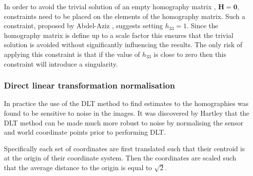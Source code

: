 \documentclass[12pt,oneside,openany,a4paper, %
english, %
masters-t, goldenblock]{usthesis}
\begin{document}
In order to avoid the trivial solution of an empty homography matrix , $\bm{H}=\bm{0}$, constraints need to be placed on the elements of the homography matrix. Such a constraint, proposed by Abdel-Aziz \cite{abdel1971direct}, suggests setting $h_{33}=1$. Since the homography matrix is define up to a scale factor this ensures that the trivial solution is avoided without significantly influencing the results. The only risk of applying this constraint is that if the value of $h_{33}$ is close to zero then this constraint will introduce a singularity.


\subsubsection{Direct linear transformation normalisation}
In practice the use of the DLT method to find estimates to the homographies was found to be sensitive to noise in the images. It was discovered by Hartley \cite{DLTnorm} that the DLT method can be made much more robust to noise by normalising the sensor and world coordinate points prior to performing DLT. 

Specifically each set of coordinates are first translated such that their centroid is at the origin of their coordinate system. Then the coordinates are scaled such that the average distance to the origin is equal to $\sqrt{2}$. 


\end{document}
